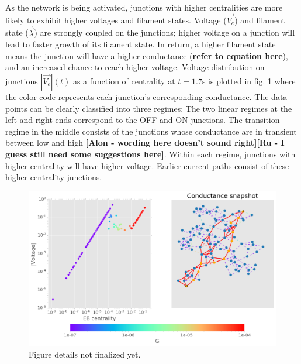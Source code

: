 \documentclass[fleqn,10pt,  amsmath,amssymb,aps]{wlscirep}
\begin{document}
As the network is being activated, junctions with higher centralities are more likely to exhibit higher voltages and filament states. Voltage ($\vec{V_e}$) and filament state ($\vec{\lambda}$) are strongly coupled on the junctions; higher voltage on a junction will lead to faster growth of its filament state. In return, a higher filament state means the junction will have a higher conductance (\textbf{refer to equation here}), and an increased chance to reach higher voltage. Voltage distribution on junctions $|\vec{V_e}|(t)$ as a function of centrality at $t = 1.7$s is plotted in fig. \ref{fig:v_snapshot} where the color code represents each junction's corresponding conductance. The data points can be clearly classified into three regimes: The two linear regimes at the left and right ends correspond to the OFF and ON junctions. The transition regime in the middle consists of the junctions whose conductance are in transient between low and high \textbf{[Alon -  wording here doesn't sound right][Ru - I guess still need some suggestions here]}. Within each regime, junctions with higher centrality will have higher voltage. Earlier current paths consist of these higher centrality junctions.

\begin{figure}[h]
	\centering
	\includegraphics[width=0.9\linewidth]{figure/v_snapshot.png}
	\caption{Figure details not finalized yet.}
	\label{fig:v_snapshot}
\end{figure}

\end{document}
